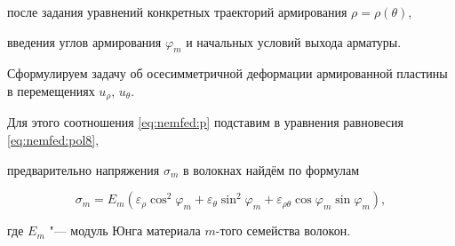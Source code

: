  после задания уравнений конкретных траекторий армирования $\rho=\rho(\theta)$,

 введения углов армирования $\varphi_m$ и начальных условий выхода арматуры.










\smallskip




Сформулируем задачу об осесимметричной деформации армированной пластины в перемещениях $u_\rho$, $u_\theta$. 

Для этого соотношения \eqref{eq:nemfed:p} подставим в уравнения равновесия \eqref{eq:nemfed:pol8},

предварительно напряжения $\sigma_m$ в волокнах найдём по формулам

\begin{equation}

\label{eq:nemfed:pol10}

\sigma_m=E_m (\varepsilon_\rho\cos^2\varphi_m+\varepsilon_\theta\sin^2\varphi_m+

\varepsilon_{\rho\theta}\cos\varphi_m\sin\varphi_m),

 \end{equation}

 где $E_m$ "--- модуль Юнга материала $m$-того семейства волокон.




